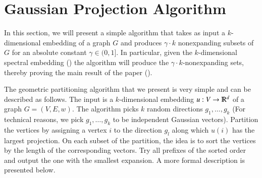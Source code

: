 \documentclass[11pt]{article}
\newcommand{\Pnote}{\Authornote{Prasad}}
\begin{document}
\section{Gaussian Projection Algorithm} \label{sec:algorithm}
 
In this section, we will present a simple algorithm that takes as
input a $k$-dimensional embedding of a graph $G$ and produces
$\gamma\cdot k$ nonexpanding subsets of $G$ for an absolute constant $\gamma \in (0,1]$.
%
In particular, given the $k$-dimensional spectral embedding
() the algorithm will produce the
$\gamma \cdot k$-nonexpanding sets, thereby proving the main result of the
paper ().
%

The geometric partitioning algorithm that we present is very simple
and can be described as follows. 
%
The input is a $k$-dimensional embedding $u : V \to \R^d$ of a graph $G = (V,E,w)$.
%
%
The algorithm picks $k$ random directions $g_1, \ldots, g_k$ (For technical reasons, we pick
$g_1, \ldots, g_k$ to be independent Gaussian vectors).
%
Partition the vertices by assigning a vertex $i$ to 
the direction $g_l$ along which  $u(i)$ has the largest projection.
%
On each subset of the partition, the idea is to sort the vertices by
the length of the corresponding vectors.  Try all prefixes of the
sorted order and output the one with the smallest expansion.  A more
formal description is presented below.
\end{document}
